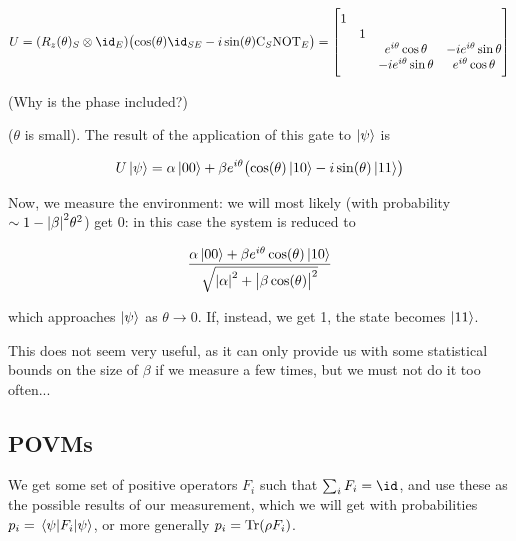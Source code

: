 \documentclass[main.tex]{subfiles}
\begin{document}
\begin{equation}
    U = (R_z (\theta)_S \otimes \id_E ) \qty(\cos(\theta) \id_{SE} - i \sin(\theta)
    \text{C}_S\text{NOT}_E  )
    = \begin{bmatrix}
    1   &   &   &  \\
       & 1  &   &  \\
       &   & e^{i \theta} \cos \theta   & - ie^{i \theta} \sin \theta   \\
       &   &  - ie^{i \theta} \sin \theta  & e^{i \theta} \cos \theta
   \end{bmatrix}
\end{equation}

\begin{greenbox}
    (Why is the phase included?)
\end{greenbox}

(\(\theta\) is small).
The result of the application of this gate to \(\ket{\psi} \) is

\begin{equation}
    U \ket{\psi}
    = \alpha \ket{00} + \beta e^{i \theta} \qty( \cos(\theta) \ket{10} -i \sin(\theta) \ket{11}  )
\end{equation}

Now, we measure the environment: we will most likely (with probability \(\sim 1- \abs{\beta}^2 \theta^2 \)) get \(0\): in this case the system is reduced to

\begin{equation}
    \frac{\alpha \ket{00} + \beta e^{i \theta} \cos(\theta) \ket{10}}
    {\sqrt{\abs{\alpha}^2 + \abs{\beta \cos(\theta) }^2  } }
\end{equation}

which approaches \(\ket\psi\) as \(\theta \rightarrow 0\).
If, instead, we get 1, the state becomes \(\ket{11}\).

This does not seem very useful, as it can only provide us with some statistical bounds on the size of \(\beta\) if we measure a few times, but we must not do it too often...

\subsection{POVMs} \label{subsec:POVM}

We get some set of positive operators \(F_i\) such that \(\sum _{i}  F_i = \id \), and use these as the possible results of our measurement, which we will get with probabilities \(p_i = \ev{F_i}{\psi}\), or more generally \(p_i = \operatorname*{Tr}(\rho F_i)\).
\end{document}
